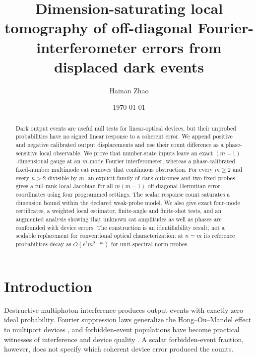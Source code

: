 \documentclass[aps,pra,reprint,amsmath,amssymb,superscriptaddress,longbibliography]{revtex4-2}
\begin{document}
\title{Dimension-saturating local tomography of off-diagonal
Fourier-interferometer errors from displaced dark events}

\author{Hainan Zhao}

\date{\today}

\begin{abstract}
Dark output events are useful null tests for linear-optical devices, but
their unprobed probabilities have no signed linear response to a coherent
error.  We append positive and negative calibrated output displacements and
use their count difference as a phase-sensitive local observable.  We prove
that number-state inputs leave an exact $(m-1)$-dimensional gauge at an
$m$-mode Fourier interferometer, whereas a phase-calibrated fixed-number
multimode cat removes that continuous obstruction.  For every $m\geq2$ and
every $n>2$ divisible by $m$, an explicit family of dark outcomes and two
fixed probes gives a full-rank local Jacobian for all $m(m-1)$ off-diagonal
Hermitian error coordinates using four programmed settings.  The scalar
response count saturates a dimension bound within the declared weak-probe
model.  We also give exact four-mode certificates, a weighted local
estimator, finite-angle and finite-shot tests, and an augmented analysis
showing that unknown cat amplitudes as well as phases are confounded with
device errors.  The construction is an identifiability result, not a
scalable replacement for conventional optical characterization: at $n=m$
its reference probabilities decay as $O(\epsilon^2m^{2-m})$ for
unit-spectral-norm probes.
\end{abstract}

\maketitle

\section{Introduction}
\label{sec:introduction}

Destructive multiphoton interference produces output events with exactly
zero ideal probability.  Fourier suppression laws generalize the
Hong--Ou--Mandel effect to multiport devices
\cite{Tichy2010,Crespi2016,Dittel2018PRL,Dittel2018PRA,Bezerra2023}, and
forbidden-event populations have become practical witnesses of interference
and device quality \cite{Crespi2016,Wang2023,Sanz2026}.  A scalar
forbidden-event fraction, however, does not specify which coherent device
error produced the counts.
\end{document}
